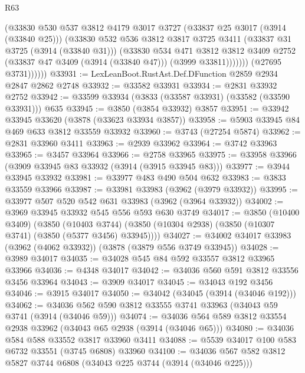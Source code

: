 \begin{lexlean}{R63}
\begin{coremodule}
                    (@33830
                      @530
                      @537
                      @3812
                      @4179
                      @3017
                      @3727
                      (@33837 @25 @3017 (@3914 (@33840 @25)))
                      (@33830
                        @532
                        @536
                        @3812
                        @3817
                        @3725
                        @3411
                        (@33837 @31 @3725 (@3914 (@33840 @31)))
                        (@33830
                          @534
                          @471
                          @3812
                          @3812
                          @3409
                          @2752
                          (@33837 @47 @3409 (@3914 (@33840 @47)))
                          (@3999 @33811)))))))
              (@27695 @3731))))))
@33931 := LexLeanBoot.RustAst.Def.DFunction @2859 @2934 @2847 @2862 @2748
@33932 := @33582 @33931
@33934 := @2831 @33932 @2752
@33942 := @33599 @33934 (@3833 (@33587 @33931) (@33582 (@33590 @33931))) @635
@33945 := @3850 (@3854 @33932) @3857
@33951 := @33942 @33945 @33620 (@3878 (@33623 @33934 @3857))
@33958 := @5903 @33945 @84 @469 @633 @3812 @33559 @33932
@33960 := @3743 (@27254 @5874)
@33962 := @2831 @33960 @3411
@33963 := @2939 @33962
@33964 := @3742 @33963
@33965 := @3457 @33964
@33966 := @2758 @33965
@33975 := @33958 @33966 (@3909 @33945 @83 @33932 (@3914 (@3915 @33945 @83)))
@33977 := @3944 @33945 @33932
@33981 := @33977 @483 @490 @504 @632
@33983 := @3833 @33559 @33966
@33987 := @33981 @33983 (@3962 (@3979 @33932))
@33995 := @33977 @507 @520 @542 @631 @33983 (@3962 (@3964 @33932))
@34002 := @3969 @33945 @33932 @545 @556 @593 @630 @3749
@34017 := @3850
    (@10400 @3409)
    (@3850
      (@10403 @3744)
      (@3850 (@10304 @2938) (@3850 (@10307 @3741) (@3850 (@5377 @3456) @33945))))
@34027 := @34002 @34017 @33983 (@3962 (@4062 @33932)) (@3878 (@3879 @556 @3749 @33945))
@34028 := @3989 @34017
@34035 := @34028 @545 @84 @592 @33557 @3812 @33965 @33966
@34036 := @4348 @34017
@34042 := @34036 @560 @591 @3812 @33556 @3456 @33964
@34043 := @3909 @34017
@34045 := @34043 @192 @3456
@34046 := @3915 @34017
@34050 := @34042 (@34045 (@3914 (@34046 @192)))
@34062 := @34036 @562 @590 @3812 @33555 @3741 @33963 (@34043 @59 @3741 (@3914 (@34046 @59)))
@34074 := @34036 @564 @589 @3812 @33554 @2938 @33962 (@34043 @65 @2938 (@3914 (@34046 @65)))
@34080 := @34036 @584 @588 @33552 @3817 @33960 @3411
@34088 := @5539 @34017 @100 @583 @6732 @33551 (@3745 @6808) @33960
@34100 := @34036 @567 @582 @3812 @5827 @3744 @6808 (@34043 @225 @3744 (@3914 (@34046 @225)))

\end{coremodule}
\end{lexlean}
